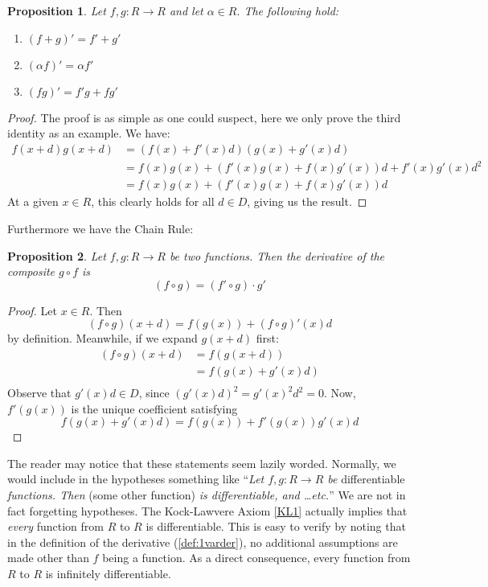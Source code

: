\documentclass[11pt]{article}
\newtheorem{proposition}{Proposition}[section]
\theoremstyle{definition}
\numberwithin{equation}{section}
\begin{document}
\begin{proposition}
  Let \( f,g:R\to R \) and let \(\alpha\in R.\) The following hold:
  \begin{enumerate}
    \item \((f+g)' = f'+g'\)
    \item \((\alpha f)' = \alpha f'\)
    \item \((fg)' = f'g + fg'\)
  \end{enumerate}
\end{proposition}
\begin{proof}
  The proof is as simple as one could suspect, here we only prove the third identity as an example. We have:
  \begin{align*}
    f(x+d)g(x+d) & = (f(x)+f'(x)d)(g(x)+g'(x)d) \\
                 & = f(x)g(x) + (f'(x)g(x)+f(x)g'(x))d + f'(x)g'(x)d^2 \\
		 & = f(x)g(x) + (f'(x)g(x)+f(x)g'(x))d  
    \label{eq:prodrule}
  \end{align*}
  At a given \( x\in R \), this clearly holds for all \( d\in D \), giving us the result.
\end{proof}

Furthermore we have the Chain Rule:
\begin{proposition}
  Let \( f,g:R\to R \) be two functions. Then the derivative of the composite \( g\circ f \) is
  \[
    (f\circ g) = (f'\circ g)\cdot g'
  \]
\end{proposition}
\begin{proof}
  Let \( x\in R \). Then
  \[
   (f\circ g)(x+d) = f(g(x)) + (f\circ g)'(x)d
  \]
  by definition. Meanwhile, if we expand \( g(x+d) \) first:
  \begin{align*}
    (f\circ g)(x+d) & = f(g(x+d)) \\
                    & = f(g(x)+g'(x)d) \\
  \end{align*}
  Observe that \( g'(x)d\in D \), since \( (g'(x)d)^2 = g'(x)^2d^2 = 0 \). Now, \( f'(g(x)) \) is the unique coefficient satisfying
  \[
    f(g(x)+g'(x)d) = f(g(x)) + f'(g(x))g'(x)d
  \]
\end{proof}

The reader may notice that these statements seem lazily worded. Normally, we would include in the hypotheses something like ``\textit{Let \( f,g:R\to R \) be} differentiable \textit{functions. Then} (some other function) \textit{is differentiable, and \dots etc.}'' We are not in fact forgetting hypotheses. The Kock-Lawvere Axiom \ref{KL1} actually implies that \textit{every} function from \( R \) to \( R \) is differentiable. This is easy to verify by noting that in the definition of the derivative (\ref{def:1varder}), no additional assumptions are made other than \( f \) being a function. As a direct consequence, every function from \( R \) to \( R \) is infinitely differentiable.
\end{document}
